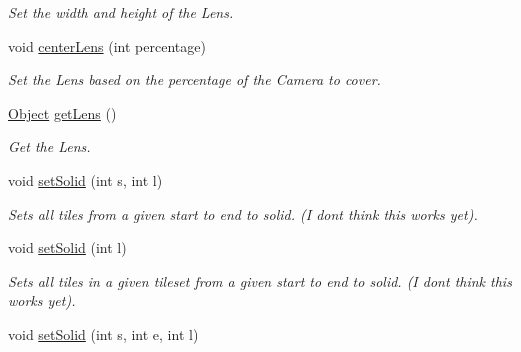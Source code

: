 \begin{DoxyCompactItemize}
\begin{DoxyCompactList}\small\item\em Set the width and height of the Lens. \end{DoxyCompactList}\item 
void \hyperlink{classTileset_a0738a218f43e5dd0cfed224ac7db02c5}{center\+Lens} (int percentage)\hypertarget{classTileset_a0738a218f43e5dd0cfed224ac7db02c5}{}\label{classTileset_a0738a218f43e5dd0cfed224ac7db02c5}

\begin{DoxyCompactList}\small\item\em Set the Lens based on the percentage of the Camera to cover. \end{DoxyCompactList}\item 
\hyperlink{classObject}{Object} \hyperlink{classTileset_a1dfdb1ee8aa546ddf4acc23cd68774e1}{get\+Lens} ()\hypertarget{classTileset_a1dfdb1ee8aa546ddf4acc23cd68774e1}{}\label{classTileset_a1dfdb1ee8aa546ddf4acc23cd68774e1}

\begin{DoxyCompactList}\small\item\em Get the Lens. \end{DoxyCompactList}\item 
void \hyperlink{classTileset_a752eb3d100602fe71e7ec306e892388a}{set\+Solid} (int s, int l)\hypertarget{classTileset_a752eb3d100602fe71e7ec306e892388a}{}\label{classTileset_a752eb3d100602fe71e7ec306e892388a}

\begin{DoxyCompactList}\small\item\em Sets all tiles from a given start to end to solid. (I don\textquotesingle{}t think this works yet). \end{DoxyCompactList}\item 
void \hyperlink{classTileset_a1d8e5e7ff9a7895d8fc80a6f392fe598}{set\+Solid} (int l)\hypertarget{classTileset_a1d8e5e7ff9a7895d8fc80a6f392fe598}{}\label{classTileset_a1d8e5e7ff9a7895d8fc80a6f392fe598}

\begin{DoxyCompactList}\small\item\em Sets all tiles in a given tileset from a given start to end to solid. (I don\textquotesingle{}t think this works yet). \end{DoxyCompactList}\item 
void \hyperlink{classTileset_a2b4b667b8864e0e99c65970aeabd69cc}{set\+Solid} (int s, int e, int l)\hypertarget{classTileset_a2b4b667b8864e0e99c65970aeabd69cc}{}\label{classTileset_a2b4b667b8864e0e99c65970aeabd69cc}


\end{DoxyCompactItemize}
